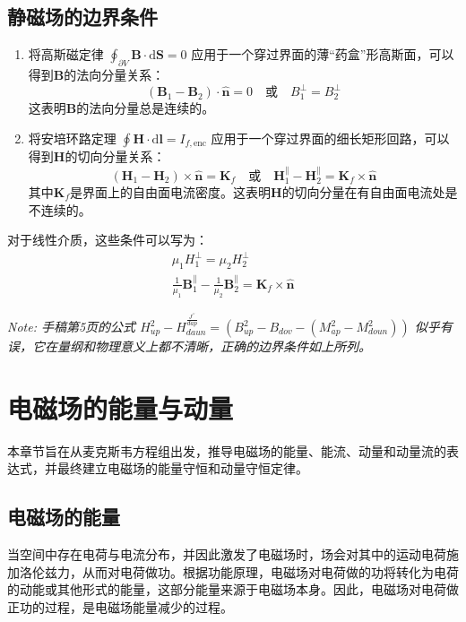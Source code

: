\documentclass[fontset=none]{ctexart}
\begin{document}
\subsection{静磁场的边界条件}
\begin{enumerate}
    \item 将高斯磁定律 $\oint_{\partial V} \bm{B} \cdot \mathrm{d}\bm{S} = 0$ 应用于一个穿过界面的薄“药盒”形高斯面，可以得到$\bm{B}$的法向分量关系：
    \begin{equation}
        (\bm{B}_1 - \bm{B}_2) \cdot \hat{\bm{n}} = 0 \quad \text{或} \quad B_{1}^{\perp} = B_{2}^{\perp}
    \end{equation}
    这表明$\bm{B}$的法向分量总是连续的。
    \item 将安培环路定理 $\oint \bm{H} \cdot \mathrm{d}\bm{l} = I_{f, \text{enc}}$ 应用于一个穿过界面的细长矩形回路，可以得到$\bm{H}$的切向分量关系：
    \begin{equation}
        (\bm{H}_1 - \bm{H}_2) \times \hat{\bm{n}} = \bm{K}_f \quad \text{或} \quad \bm{H}_{1}^{\parallel} - \bm{H}_{2}^{\parallel} = \bm{K}_f \times \hat{\bm{n}}
    \end{equation}
    其中$\bm{K}_f$是界面上的自由面电流密度。这表明$\bm{H}$的切向分量在有自由面电流处是不连续的。
\end{enumerate}
对于线性介质，这些条件可以写为：
\begin{gather}
    \mu_1 H_{1}^{\perp} = \mu_2 H_{2}^{\perp} \\
    \frac{1}{\mu_1} \bm{B}_{1}^{\parallel} - \frac{1}{\mu_2} \bm{B}_{2}^{\parallel} = \bm{K}_f \times \hat{\bm{n}}
\end{gather}

\textit{Note: 手稿第5页的公式 {\color{red}$H_{up}^{2}-H_{daun}^{\frac{J^{\prime\prime}}{dap}}=(B_{up}^{2}-B_{dov}-(M_{ap}^{2}-M_{doun}^{2}))$} 似乎有误，它在量纲和物理意义上都不清晰，正确的边界条件如上所列。}

\section{电磁场的能量与动量}
本章节旨在从麦克斯韦方程组出发，推导电磁场的能量、能流、动量和动量流的表达式，并最终建立电磁场的能量守恒和动量守恒定律。

\subsection{电磁场的能量}

\begin{definition}[电磁场对电荷做功]
当空间中存在电荷与电流分布，并因此激发了电磁场时，场会对其中的运动电荷施加洛伦兹力，从而对电荷做功。根据功能原理，电磁场对电荷做的功将转化为电荷的动能或其他形式的能量，这部分能量来源于电磁场本身。因此，电磁场对电荷做正功的过程，是电磁场能量减少的过程。
\end{definition}
\end{document}
